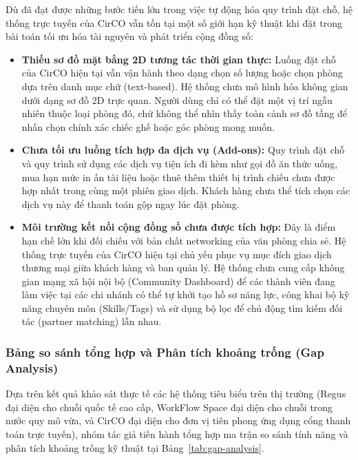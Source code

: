 
Dù đã đạt được những bước tiến lớn trong việc tự động hóa quy trình đặt chỗ, hệ thống trực tuyến của CirCO vẫn tồn tại một số giới hạn kỹ thuật khi đặt trong bài toán tối ưu hóa tài nguyên và phát triển cộng đồng số:

\begin{itemize}
    \item \textbf{Thiếu sơ đồ mặt bằng 2D tương tác thời gian thực:} Luồng đặt chỗ của CirCO hiện tại vẫn vận hành theo dạng chọn số lượng hoặc chọn phòng dựa trên danh mục chữ (text-based). Hệ thống chưa mô hình hóa không gian dưới dạng sơ đồ 2D trực quan. Người dùng chỉ có thể đặt một vị trí ngẫu nhiên thuộc loại phòng đó, chứ không thể nhìn thấy toàn cảnh sơ đồ tầng để nhấn chọn chính xác chiếc ghế hoặc góc phòng mong muốn.
    \item \textbf{Chưa tối ưu luồng tích hợp đa dịch vụ (Add-ons):} Quy trình đặt chỗ và quy trình sử dụng các dịch vụ tiện ích đi kèm như gọi đồ ăn thức uống, mua hạn mức in ấn tài liệu hoặc thuê thêm thiết bị trình chiếu chưa được hợp nhất trong cùng một phiên giao dịch. Khách hàng chưa thể tích chọn các dịch vụ này để thanh toán gộp ngay lúc đặt phòng.
    \item \textbf{Môi trường kết nối cộng đồng số chưa được tích hợp:} Đây là điểm hạn chế lớn khi đối chiếu với bản chất networking của văn phòng chia sẻ. Hệ thống trực tuyến của CirCO hiện tại chủ yếu phục vụ mục đích giao dịch thương mại giữa khách hàng và ban quản lý. Hệ thống chưa cung cấp không gian mạng xã hội nội bộ (Community Dashboard) để các thành viên đang làm việc tại các chi nhánh có thể tự khởi tạo hồ sơ năng lực, công khai bộ kỹ năng chuyên môn (Skills/Tags) và sử dụng bộ lọc để chủ động tìm kiếm đối tác (partner matching) lẫn nhau.
\end{itemize}

\subsubsection{Bảng so sánh tổng hợp và Phân tích khoảng trống (Gap Analysis)}

Dựa trên kết quả khảo sát thực tế các hệ thống tiêu biểu trên thị trường (Regus đại diện cho chuỗi quốc tế cao cấp, WorkFlow Space đại diện cho chuỗi trong nước quy mô vừa, và CirCO đại diện cho đơn vị tiên phong ứng dụng cổng thanh toán trực tuyến), nhóm tác giả tiến hành tổng hợp ma trận so sánh tính năng và phân tích khoảng trống kỹ thuật tại Bảng~\ref{tab:gap-analysis}.

